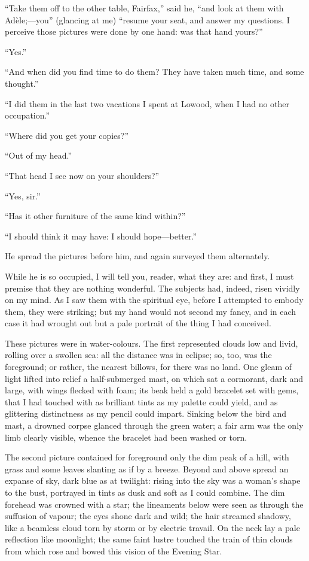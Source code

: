 \enquote{Take them off to the other table, \Mrs{} Fairfax,} said he,
\enquote{and look at them with Adèle;---you} (glancing at me)
\enquote{resume your seat, and answer my questions. I perceive those
	pictures were done by one hand: was that hand yours?}

\enquote{Yes.}

\enquote{And when did you find time to do them? They have taken much
	time, and some thought.}

\enquote{I did them in the last two vacations I spent at Lowood, when I
	had no other occupation.}

\enquote{Where did you get your copies?}

\enquote{Out of my head.}

\enquote{That head I see now on your shoulders?}

\enquote{Yes, sir.}

\enquote{Has it other furniture of the same kind within?}

\enquote{I should think it may have: I should hope---better.}

He spread the pictures before him, and again surveyed them alternately.

While he is so occupied, I will tell you, reader, what they are: and
first, I must premise that they are nothing wonderful. The subjects
had, indeed, risen vividly on my mind. As I saw them with the spiritual
eye, before I attempted to embody them, they were striking; but my hand
would not second my fancy, and in each case it had wrought out but a
pale portrait of the thing I had conceived.

These pictures were in water-colours. The first represented clouds low
and livid, rolling over a swollen sea: all the distance was in eclipse;
so, too, was the foreground; or rather, the nearest billows, for there
was no land. One gleam of light lifted into relief a half-submerged
mast, on which sat a cormorant, dark and large, with wings flecked with
foam; its beak held a gold bracelet set with gems, that I had touched
with as brilliant tints as my palette could yield, and as glittering
distinctness as my pencil could impart. Sinking below the bird and
mast, a drowned corpse glanced through the green water; a fair arm was
the only limb clearly visible, whence the bracelet had been washed or
torn.

The second picture contained for foreground only the dim peak of a hill,
with grass and some leaves slanting as if by a breeze. Beyond and above
spread an expanse of sky, dark blue as at twilight: rising into the sky
was a woman's shape to the bust, portrayed in tints as dusk and soft as
I could combine. The dim forehead was crowned with a star; the
lineaments below were seen as through the suffusion of vapour; the eyes
shone dark and wild; the hair streamed shadowy, like a beamless cloud
torn by storm or by electric travail. On the neck lay a pale reflection
like moonlight; the same faint lustre touched the train of thin clouds
from which rose and bowed this vision of the Evening Star.

